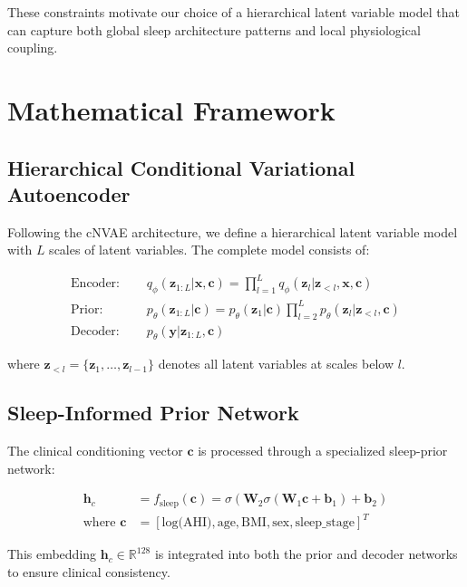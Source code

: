 \documentclass[11pt]{article}
\begin{document}
These constraints motivate our choice of a hierarchical latent variable model that can capture both global sleep architecture patterns and local physiological coupling.

\section{Mathematical Framework}

\subsection{Hierarchical Conditional Variational Autoencoder}

Following the cNVAE architecture, we define a hierarchical latent variable model with $L$ scales of latent variables. The complete model consists of:

\begin{align}
\text{Encoder: } \quad &q_\phi(\mathbf{z}_{1:L} | \mathbf{x}, \mathbf{c}) = \prod_{l=1}^L q_\phi(\mathbf{z}_l | \mathbf{z}_{<l}, \mathbf{x}, \mathbf{c}) \\
\text{Prior: } \quad &p_\theta(\mathbf{z}_{1:L} | \mathbf{c}) = p_\theta(\mathbf{z}_1 | \mathbf{c}) \prod_{l=2}^L p_\theta(\mathbf{z}_l | \mathbf{z}_{<l}, \mathbf{c}) \\
\text{Decoder: } \quad &p_\theta(\mathbf{y} | \mathbf{z}_{1:L}, \mathbf{c})
\end{align}

where $\mathbf{z}_{<l} = \{\mathbf{z}_1, \ldots, \mathbf{z}_{l-1}\}$ denotes all latent variables at scales below $l$.

\subsection{Sleep-Informed Prior Network}

The clinical conditioning vector $\mathbf{c}$ is processed through a specialized sleep-prior network:

\begin{align}
\mathbf{h}_c &= f_{\text{sleep}}(\mathbf{c}) = \sigma(\mathbf{W}_2 \sigma(\mathbf{W}_1 \mathbf{c} + \mathbf{b}_1) + \mathbf{b}_2) \\
\text{where } \mathbf{c} &= [\text{log(AHI)}, \text{age}, \text{BMI}, \text{sex}, \text{sleep\_stage}]^T
\end{align}

This embedding $\mathbf{h}_c \in \mathbb{R}^{128}$ is integrated into both the prior and decoder networks to ensure clinical consistency.
\end{document}
